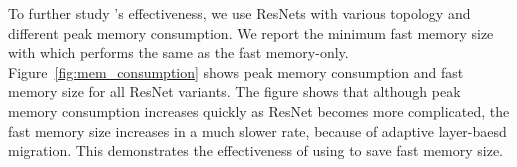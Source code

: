 To further study \name's effectiveness, we use ResNets with various topology and different peak memory consumption. We report the minimum fast memory size with which \name performs the same as the fast memory-only. %
Figure~\ref{fig:mem_consumption} shows peak memory consumption and fast memory size for all ResNet variants. The figure shows that although peak memory consumption increases quickly as ResNet becomes more complicated, the fast memory size increases in a much slower rate, \textcolor{dong}{because of adaptive layer-baesd migration.}  
This demonstrates the effectiveness of using \name to save fast memory size.

